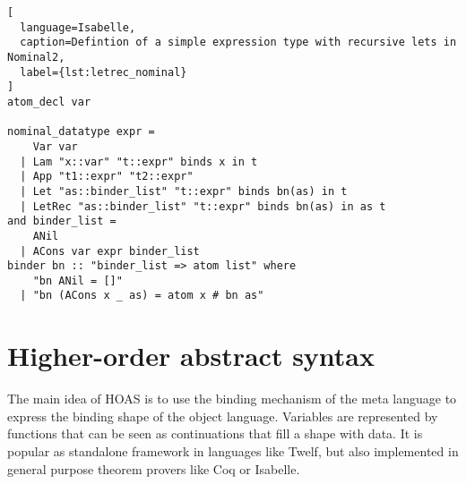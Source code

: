 \begin{lstlisting}[
  language=Isabelle,
  caption=Defintion of a simple expression type with recursive lets in Nominal2,
  label={lst:letrec_nominal}
]
atom_decl var

nominal_datatype expr =
    Var var
  | Lam "x::var" "t::expr" binds x in t
  | App "t1::expr" "t2::expr"
  | Let "as::binder_list" "t::expr" binds bn(as) in t
  | LetRec "as::binder_list" "t::expr" binds bn(as) in as t
and binder_list =
    ANil
  | ACons var expr binder_list
binder bn :: "binder_list => atom list" where
    "bn ANil = []"
  | "bn (ACons x _ as) = atom x # bn as"
\end{lstlisting}

\section{Higher-order abstract syntax}

The main idea of \ac{HOAS} is to use the binding mechanism of the meta language to express the binding shape of the object language. Variables are represented by functions that can be seen as continuations that fill a shape with data. It is popular as standalone framework in languages like Twelf\cite{twelf}, but also implemented in general purpose theorem provers like Coq or Isabelle.

